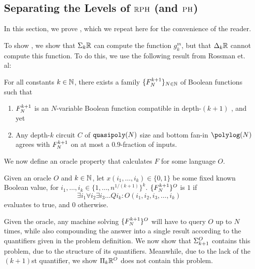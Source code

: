 \documentclass{article}
\begin{document}
\subsection{Separating the Levels of \(\mathbb{R}\textsc{PH}\) (and \(\textsc{PH}\))}
\label{sec:SepLevelsRPH}
In this section, we prove , which we repeat here for the convenience of the reader.

\RPHlayers*

To show , we show that $\Sigma_{k}\mathbb{R}$ can compute the function $g^m_k$, but that $\Delta_{k}\mathbb{R}$ cannot compute this function.
To do this, we use the following result from Rossman et. al:

\begin{lemma}
    \label{thm:averageCaseDepthHierarchyTheorem}
    For all constants $k \in \mathbb{N}$, there exists a family $\{ F^{k+1}_N \}_{N \in \mathbb{N}}$ of Boolean functions such that
    \begin{enumerate}
        \item $F^{k+1}_N$ is an $N$-variable Boolean function compatible in depth-$(k+1)$ \AC, and yet
        \item Any depth-$k$ circuit $C$ of $\mathtt{quasipoly}(N)$ size and bottom fan-in $\polylog(N)$ agrees with $F^{k+1}_N$ on at most a $0.9$-fraction of inputs.
    \end{enumerate}
\end{lemma}

We now define an oracle property that calculates $F$ for some language $O$.
\begin{definition}[$\{ \sipser \}^O$]
    Given an oracle $O$ and $k \in \mathbb{N}$, let $x(i_1, \ldots, i_k)\in \{0,1\}$ be some fixed known Boolean value, for $i_1, \dots, i_k \in \{ 1, \dots, n^{1/(k+1)} \}^k $.
    \(\{\sipser\}^O\) is \(1\) if 
    \[\ \exists i_1 \forall i_2 \exists i_3 \dots Q i_k : O(i_1, i_2, i_3, \dots, i_k) \]
    evaluates to true, and \(0\) otherwise.
\end{definition}


Given the oracle, any machine solving $\{\sipser\}^O$ will have to query $O$ up to $N$ times, while also compounding the answer into a single result according to the quantifiers given in the problem definition.
We now show that $\Sigma_{k+1}^{O}$ contains this problem, due to the structure of its quantifiers.
Meanwhile, due to the lack of the $(k+1)$st quantifier, we show $\Pi_{k}\mathbb{R}^O$ does not contain this problem.
\end{document}
